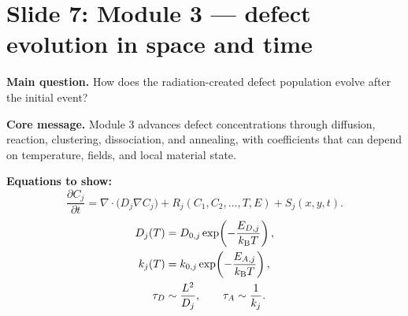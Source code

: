 \documentclass[11pt]{article}
\begin{document}
\section{Slide 7: Module 3 --- defect evolution in space and time}
\begin{physicsbox}
\textbf{Main question.} How does the radiation-created defect population evolve after the initial event?
\end{physicsbox}

\textbf{Core message.} Module 3 advances defect concentrations through diffusion, reaction, clustering, dissociation, and annealing, with coefficients that can depend on temperature, fields, and local material state.

\textbf{Equations to show:}
\begin{equation*}
\frac{\partial C_j}{\partial t}
=\nabla\cdot\bigl(D_j\nabla C_j\bigr)
+R_j(C_1,C_2,\dots,T,E)+S_j(x,y,t).
\end{equation*}
\begin{align*}
D_j(T) &= D_{0,j}\exp\!\left(-\frac{E_{D,j}}{k_{\mathrm{B}} T}\right),\\
k_j(T) &= k_{0,j}\exp\!\left(-\frac{E_{A,j}}{k_{\mathrm{B}} T}\right),\\
\tau_D &\sim \frac{L^2}{D_j},\qquad \tau_A\sim \frac{1}{k_j}.
\end{align*}
\end{document}
